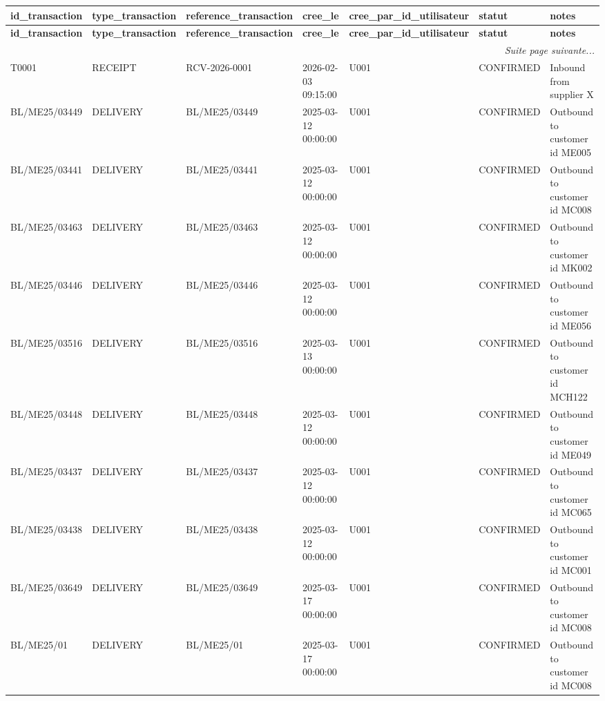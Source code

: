 \documentclass[a4paper,11pt]{article}
\begin{document}
\begin{landscape}
\scriptsize
\begin{longtable}{|l|l|l|l|l|l|l|}
\hline
\rowcolor{headerblue}
\textbf{id\_transaction} & \textbf{type\_transaction} & \textbf{reference\_transaction} & \textbf{cree\_le} & \textbf{cree\_par\_id\_utilisateur} & \textbf{statut} & \textbf{notes} \\ \hline
\endfirsthead
\hline
\rowcolor{headerblue}
\textbf{id\_transaction} & \textbf{type\_transaction} & \textbf{reference\_transaction} & \textbf{cree\_le} & \textbf{cree\_par\_id\_utilisateur} & \textbf{statut} & \textbf{notes} \\ \hline
\endhead
\hline \multicolumn{7}{|r|}{\textit{Suite page suivante...}} \\ \hline
\endfoot
\hline
\endlastfoot
 T0001 & RECEIPT & RCV-2026-0001 & 2026-02-03 09:15:00 & U001 & CONFIRMED & Inbound from supplier X \\ \hline
\rowcolor{rowgray} BL/ME25/03449 & DELIVERY & BL/ME25/03449 & 2025-03-12 00:00:00 & U001 & CONFIRMED & Outbound to customer id ME005 \\ \hline
 BL/ME25/03441 & DELIVERY & BL/ME25/03441 & 2025-03-12 00:00:00 & U001 & CONFIRMED & Outbound to customer id MC008 \\ \hline
\rowcolor{rowgray} BL/ME25/03463 & DELIVERY & BL/ME25/03463 & 2025-03-12 00:00:00 & U001 & CONFIRMED & Outbound to customer id MK002 \\ \hline
 BL/ME25/03446 & DELIVERY & BL/ME25/03446 & 2025-03-12 00:00:00 & U001 & CONFIRMED & Outbound to customer id ME056 \\ \hline
\rowcolor{rowgray} BL/ME25/03516 & DELIVERY & BL/ME25/03516 & 2025-03-13 00:00:00 & U001 & CONFIRMED & Outbound to customer id MCH122 \\ \hline
 BL/ME25/03448 & DELIVERY & BL/ME25/03448 & 2025-03-12 00:00:00 & U001 & CONFIRMED & Outbound to customer id ME049 \\ \hline
\rowcolor{rowgray} BL/ME25/03437 & DELIVERY & BL/ME25/03437 & 2025-03-12 00:00:00 & U001 & CONFIRMED & Outbound to customer id MC065 \\ \hline
 BL/ME25/03438 & DELIVERY & BL/ME25/03438 & 2025-03-12 00:00:00 & U001 & CONFIRMED & Outbound to customer id MC001 \\ \hline
\rowcolor{rowgray} BL/ME25/03649 & DELIVERY & BL/ME25/03649 & 2025-03-17 00:00:00 & U001 & CONFIRMED & Outbound to customer id MC008 \\ \hline
 BL/ME25/01 & DELIVERY & BL/ME25/01 & 2025-03-17 00:00:00 & U001 & CONFIRMED & Outbound to customer id MC008 \\ \hline

\end{longtable}
\end{landscape}
\end{document}
